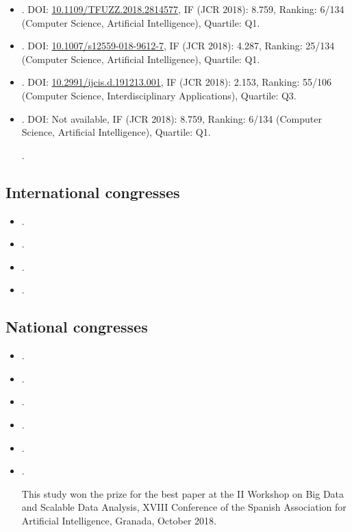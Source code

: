 \documentclass[c5paper,10pt,twoside]{book}	   	%
\newcommand{\doi}[1]{\href{https://doi.org/#1}{#1}}
\begin{document}
\begin{otherlanguage}{british}
\begin{itemize}
\item {}.  DOI: \doi{10.1109/TFUZZ.2018.2814577}, IF (JCR 2018): 8.759, Ranking: 6/134 (Computer Science, Artificial Intelligence), Quartile: Q1.

\item {}. DOI: \doi{10.1007/s12559-018-9612-7}, IF (JCR 2018): 4.287, Ranking: 25/134 (Computer Science, Artificial Intelligence), Quartile: Q1.

\item {}. DOI: \doi{10.2991/ijcis.d.191213.001}, IF (JCR 2018): 2.153, Ranking: 55/106 (Computer Science, Interdisciplinary Applications), Quartile: Q3.

\item {}.   DOI: Not available, IF (JCR 2018): 8.759, Ranking: 6/134 (Computer Science, Artificial Intelligence), Quartile: Q1.

.
		\end{itemize}
		
\subsection{International congresses}
		
	\begin{itemize}
	\item {}.
	\item {}.
	\item {}.
	\item {}.
\end{itemize}
		
\subsection{National congresses}
		
		\begin{itemize}
			\item {}.
	\item {}.
	\item {}.
	\item {}.
	\item {}.
	\item {}. 
	
			This study won the prize for the best paper at the II Workshop on Big Data and Scalable Data Analysis, XVIII Conference of the Spanish Association for Artificial Intelligence, Granada, October 2018.
		\end{itemize}
		

\end{otherlanguage}
\end{document}
